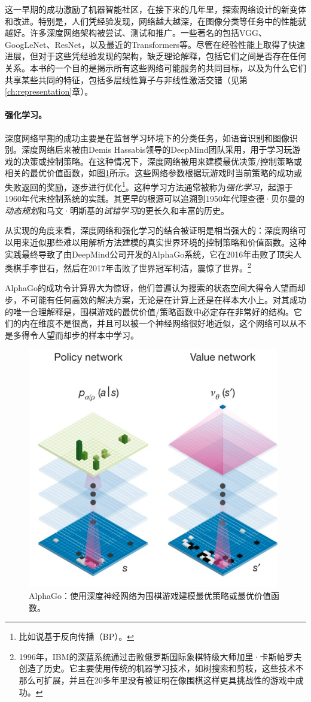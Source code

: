 \documentclass[../../book-main.tex]{subfiles}
\begin{document}
这一早期的成功激励了机器智能社区，在接下来的几年里，探索网络设计的新变体和改进。特别是，人们凭经验发现，网络越大越深，在图像分类等任务中的性能就越好。许多深度网络架构被尝试、测试和推广。一些著名的包括VGG\cite{Simonyan15}、GoogLeNet\cite{Szegedy2014GoingDW}、ResNet\cite{He2016-lc}，以及最近的Transformers\cite{vaswani2017attention}等。尽管在经验性能上取得了快速进展，但对于这些凭经验发现的架构，缺乏理论解释，包括它们之间是否存在任何关系。本书的一个目的是揭示所有这些网络可能服务的共同目标，以及为什么它们共享某些共同的特征，包括多层线性算子与非线性激活交错（见第\ref{ch:representation}章）。

\paragraph{强化学习。}
深度网络早期的成功主要是在监督学习环境下的分类任务，如语音识别和图像识别。深度网络后来被由Demis Hassabis领导的DeepMind团队采用，用于学习玩游戏的决策或控制策略。在这种情况下，深度网络被用来建模最优决策/控制策略或相关的最优价值函数，如图\ref{fig:Alpha-Go}所示。这些网络参数根据玩游戏时当前策略的成功或失败返回的奖励，逐步进行优化\footnote{比如说基于反向传播（BP）。}。这种学习方法通常被称为{\em 强化学习}\cite{Sutton-Barto}，起源于1960年代末控制系统的实践\cite{Waltz1965AHA,Mendel1970ReinforcementlearningCA}。其更早的根源可以追溯到1950年代理查德·贝尔曼的{\em 动态规划}\cite{Bellman-DP}和马文·明斯基的{\em 试错学习}\cite{Minsky-1954}的更长久和丰富的历史。

从实现的角度来看，深度网络和强化学习的结合被证明是相当强大的：深度网络可以用来近似那些难以用解析方法建模的真实世界环境的控制策略和价值函数。这种实践最终导致了由DeepMind公司开发的AlphaGo系统，它在2016年击败了顶尖人类棋手李世石，然后在2017年击败了世界冠军柯洁，震惊了世界。\footnote{1996年，IBM的深蓝系统通过击败俄罗斯国际象棋特级大师加里·卡斯帕罗夫创造了历史。它主要使用传统的机器学习技术，如树搜索和剪枝，这些技术不那么可扩展，并且在20多年里没有被证明在像围棋这样更具挑战性的游戏中成功。}

AlphaGo的成功令计算界大为惊讶，他们普遍认为搜索的状态空间大得令人望而却步，不可能有任何高效的解决方案，无论是在计算上还是在样本大小上。对其成功的唯一合理解释是，围棋游戏的最优价值/策略函数中必定存在非常好的结构。它们的内在维度不是很高，并且可以被一个神经网络很好地近似，这个网络可以从不是多得令人望而却步的样本中学习。

\begin{figure}
    \centering
    \includegraphics[width=0.5\linewidth]{figures/Policy-Value.png}
    \caption{AlphaGo：使用深度神经网络为围棋游戏建模最优策略或最优价值函数。}
    \label{fig:Alpha-Go}
\end{figure}
\end{document}
